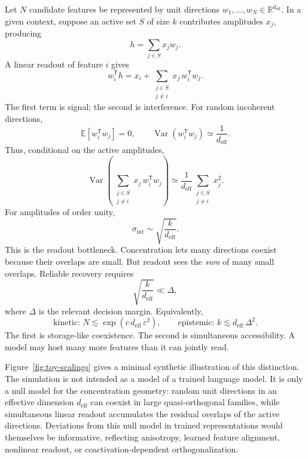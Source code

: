 \documentclass[
  aps,
  reprint,
  superscriptaddress,
  floatfix,
  nofootinbib,
  longbibliography
]{revtex4-2}
\newcommand{\R}{\mathbb{R}}
\newcommand{\E}{\mathbb{E}}
\newcommand{\deff}{d_{\mathrm{eff}}}
\newcommand{\sint}{\sigma_{\mathrm{int}}}
\newcommand{\T}{^{\mathsf{T}}}
\DeclareMathOperator{\Var}{Var}
\begin{document}
Let $N$ candidate features be represented by unit directions
$w_1,\dots,w_N\in\R^{\deff}$. In a given context, suppose an active set
$S$ of size $k$ contributes amplitudes $x_j$, producing
%
\begin{equation}
\label{eq:hidden}
h=\sum_{j\in S}x_j w_j .
\end{equation}
%
A linear readout of feature $i$ gives
%
\begin{equation}
\label{eq:readout}
w_i\T h
=
x_i+
\sum_{\substack{j\in S\\ j\neq i}}
x_j\,w_i\T w_j .
\end{equation}
%
The first term is signal; the second is interference. For random
incoherent directions,
%
\begin{equation}
\label{eq:moments}
\E[w_i\T w_j]=0,
\qquad
\Var(w_i\T w_j)\simeq \frac{1}{\deff}.
\end{equation}
%
Thus, conditional on the active amplitudes,
%
\begin{equation}
\label{eq:intvar}
\Var\!\left(
\sum_{\substack{j\in S\\ j\neq i}}
x_j\,w_i\T w_j
\right)
\simeq
\frac{1}{\deff}
\sum_{\substack{j\in S\\ j\neq i}}x_j^2 .
\end{equation}
%
For amplitudes of order unity,
%
\begin{equation}
\label{eq:sint}
\sint\sim\sqrt{\frac{k}{\deff}} .
\end{equation}
%
This is the readout bottleneck. Concentration lets many directions
coexist because their overlaps are small. But readout sees the
\emph{sum} of many small overlaps. Reliable recovery requires
%
\begin{equation}
\label{eq:snr}
\sqrt{\frac{k}{\deff}}\ll \Delta,
\end{equation}
%
where $\Delta$ is the relevant decision margin. Equivalently,
%
\begin{equation}
\label{eq:dual}
\text{kinetic: }N\lesssim\exp(c\,\deff\,\varepsilon^{2}),
\qquad
\text{epistemic: }k\lesssim\deff\,\Delta^{2}.
\end{equation}
%
The first is storage-like coexistence. The second is simultaneous
accessibility. A model may host many more features than it can jointly
read.

Figure~\ref{fig:toy-scalings} gives a minimal synthetic illustration of
this distinction. The simulation is not intended as a model of a trained
language model. It is only a null model for the concentration geometry:
random unit directions in an effective dimension $\deff$ can coexist in
large quasi-orthogonal families, while simultaneous linear readout
accumulates the residual overlaps of the active directions. Deviations
from this null model in trained representations would themselves be
informative, reflecting anisotropy, learned feature alignment, nonlinear
readout, or coactivation-dependent orthogonalization.
\end{document}
